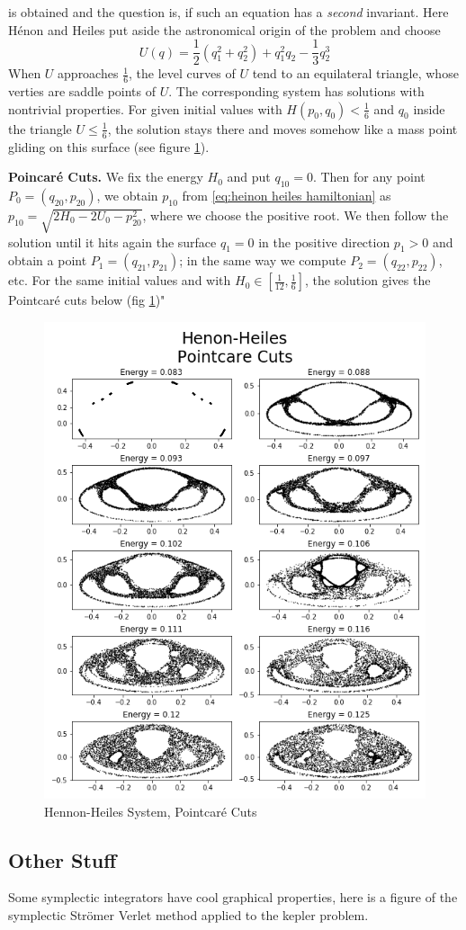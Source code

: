 \documentclass[12pt]{article}
\begin{document}
is obtained and the question is, if such an equation has a \textit{second} invariant. Here H\'enon and Heiles put aside the astronomical origin of the problem and choose
$$U(q) = \frac{1}{2}\left( q_1^2 + q_2^2 \right) + q_1^2q_2 - \frac{1}{3}q_2^3$$
When $U$ approaches $\frac{1}{6}$, the level curves of $U$ tend to an equilateral triangle, whose verties are saddle points of $U$. The corresponding system has solutions with nontrivial properties. For given initial values with $H(p_0,q_0)<\frac{1}{6}$ and $q_0$ inside the triangle $U \leq \frac{1}{6}$, the solution stays there and moves somehow like a mass point gliding on this surface (see figure \ref{fig:hennon-heiles pointcare cuts}).

\textbf{Poincar\'e Cuts.} We fix the energy $H_0$ and put $q_{10} = 0$. Then for any point $P_0 = (q_{20} , p_{20})$, we obtain $p_{10}$ from \eqref{eq:heinon heiles hamiltonian} as $p_{10} = \sqrt{2H_0 - 2U_0 - p_{20}^2}$, where we choose the positive root. We then follow the solution until it hits again the surface $q_1 = 0$ in the positive direction $p_1 > 0$ and obtain a point $P_1 = (q_{21},p_{21})$; in the same way we compute $P_2 = (q_{22},p_{22})$, etc. For the same initial values and with $H_0 \in [\frac{1}{12} , \frac{1}{6}]$, the solution gives the Pointcar\'e cuts below (fig \ref{fig:hennon-heiles pointcare cuts})" \cite{Numerical}

\begin{figure}[H]
    \centering
    \includegraphics[width=0.88\linewidth ]{"Figures/pointcare cuts hennon-heiles/hennon-heiles_pointcare_cuts"}
    \caption{Hennon-Heiles System, Pointcar\'e Cuts}
    \label{fig:hennon-heiles pointcare cuts}
\end{figure}

\subsection{Other Stuff}

Some symplectic integrators have cool graphical properties, here is a figure of the symplectic Str\"omer Verlet method applied to the kepler problem.
\end{document}
